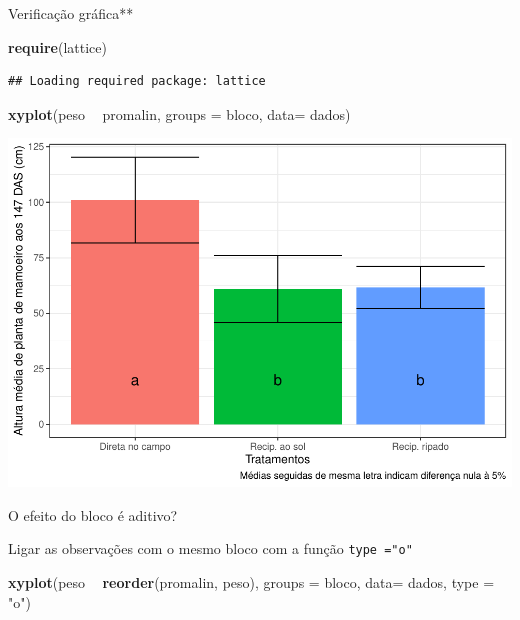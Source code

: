 \documentclass[
]{book}
\newenvironment{Shaded}{\begin{snugshade}}{\end{snugshade}}
\newcommand{\DataTypeTok}[1]{\textcolor[rgb]{0.13,0.29,0.53}{#1}}
\newcommand{\KeywordTok}[1]{\textcolor[rgb]{0.13,0.29,0.53}{\textbf{#1}}}
\newcommand{\NormalTok}[1]{#1}
\newcommand{\OperatorTok}[1]{\textcolor[rgb]{0.81,0.36,0.00}{\textbf{#1}}}
\newcommand{\StringTok}[1]{\textcolor[rgb]{0.31,0.60,0.02}{#1}}
\begin{document}
Verificação gráfica**

\begin{Shaded}
\begin{Highlighting}[]
\KeywordTok{require}\NormalTok{(lattice)}
\end{Highlighting}
\end{Shaded}

\begin{verbatim}
## Loading required package: lattice
\end{verbatim}

\begin{Shaded}
\begin{Highlighting}[]
\KeywordTok{xyplot}\NormalTok{(peso }\OperatorTok{~}\StringTok{ }\NormalTok{promalin, }
        \DataTypeTok{groups =}\NormalTok{ bloco, }
        \DataTypeTok{data=}\NormalTok{ dados)}
\end{Highlighting}
\end{Shaded}

\includegraphics{TudodoR_files/figure-latex/unnamed-chunk-320-1.pdf}

O efeito do bloco é aditivo?

Ligar as observações com o mesmo bloco com a função \texttt{type\ ="o"}

\begin{Shaded}
\begin{Highlighting}[]
\KeywordTok{xyplot}\NormalTok{(peso }\OperatorTok{~}\StringTok{ }\KeywordTok{reorder}\NormalTok{(promalin, peso), }
        \DataTypeTok{groups =}\NormalTok{ bloco, }
        \DataTypeTok{data=}\NormalTok{ dados,}
        \DataTypeTok{type =} \StringTok{"o"}\NormalTok{)}
\end{Highlighting}
\end{Shaded}
\end{document}
